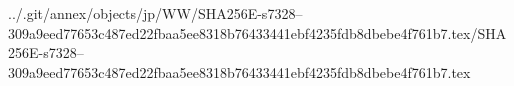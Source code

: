 ../.git/annex/objects/jp/WW/SHA256E-s7328--309a9eed77653c487ed22fbaa5ee8318b76433441ebf4235fdb8dbebe4f761b7.tex/SHA256E-s7328--309a9eed77653c487ed22fbaa5ee8318b76433441ebf4235fdb8dbebe4f761b7.tex